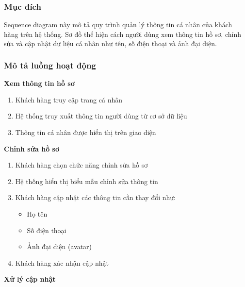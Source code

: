\subsubsection{Mục đích}

Sequence diagram này mô tả quy trình quản lý thông tin cá nhân của khách hàng trên hệ thống. Sơ đồ thể hiện cách người dùng xem thông tin hồ sơ, chỉnh sửa và cập nhật dữ liệu cá nhân như tên, số điện thoại và ảnh đại diện.

\subsubsection{Mô tả luồng hoạt động}

\textbf{Xem thông tin hồ sơ}

\begin{enumerate}[noitemsep]
    \item Khách hàng truy cập trang cá nhân
    \item Hệ thống truy xuất thông tin người dùng từ cơ sở dữ liệu
    \item Thông tin cá nhân được hiển thị trên giao diện
\end{enumerate}

\textbf{Chỉnh sửa hồ sơ}

\begin{enumerate}[noitemsep]
    \item Khách hàng chọn chức năng chỉnh sửa hồ sơ
    \item Hệ thống hiển thị biểu mẫu chỉnh sửa thông tin
    \item Khách hàng cập nhật các thông tin cần thay đổi như:
    \begin{itemize}[noitemsep]
        \item Họ tên
        \item Số điện thoại
        \item Ảnh đại diện (avatar)
    \end{itemize}
    
    \item Khách hàng xác nhận cập nhật
\end{enumerate}

\textbf{Xử lý cập nhật}

